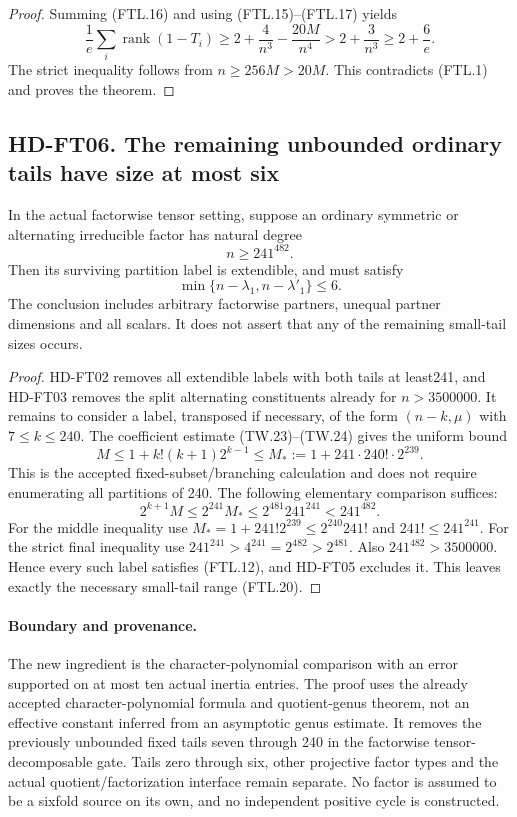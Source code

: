 \begin{proof}
Summing (FTL.16) and using (FTL.15)--(FTL.17) yields
\[
 \frac1e\sum_i\operatorname{rank}(1-T_i)
 \ge2+\frac4{n^3}-\frac{20M}{n^4}
 >2+\frac3{n^3}\ge2+\frac6e.
 \tag{FTL.18}
\]
The strict inequality follows from $n\ge256M>20M$.
This contradicts (FTL.1) and proves the theorem.
\end{proof}

\subsection*{HD-FT06. The remaining unbounded ordinary tails have size at most six}

\begin{corollary}[HD-FT06]
In the actual factorwise tensor setting, suppose an ordinary
symmetric or alternating irreducible factor has natural degree
\[
                              n\ge241^{482}.
 \tag{FTL.19}
\]
Then its surviving partition label is extendible, and must satisfy
\[
                  \min\{n-\lambda_1,n-\lambda'_1\}\le6.
 \tag{FTL.20}
\]
The conclusion includes arbitrary factorwise partners, unequal
partner dimensions and all scalars.  It does not assert that any
of the remaining small-tail sizes occurs.
\end{corollary}

\begin{proof}
HD-FT02 removes all extendible labels with both tails at least241,
and HD-FT03 removes the split alternating constituents already for
$n>3500000$.  It remains to consider a label, transposed if necessary,
of the form $(n-k,\mu)$ with $7\le k\le240$.
The coefficient estimate (TW.23)--(TW.24) gives the uniform bound
\[
 M\le1+k!(k+1)2^{k-1}
        \le M_*:=1+241\cdot240!\cdot2^{239}.
 \tag{FTL.21}
\]
This is the accepted fixed-subset/branching calculation and does not
require enumerating all partitions of 240.
The following elementary comparison suffices:
\[
 2^{k+1}M\le2^{241}M_*
       \le2^{481}241^{241}<241^{482}.
 \tag{FTL.22}
\]
For the middle inequality use $M_*=1+241!2^{239}\le2^{240}241!$
and $241!\le241^{241}$.  For the strict final inequality use
$241^{241}>4^{241}=2^{482}>2^{481}$.
Also $241^{482}>3500000$.  Hence every such label satisfies
(FTL.12), and HD-FT05 excludes it.  This leaves exactly the necessary
small-tail range (FTL.20).
\end{proof}

\paragraph{Boundary and provenance.}
The new ingredient is the character-polynomial comparison with an error
supported on at most ten actual inertia entries.  The proof uses the
already accepted character-polynomial formula and quotient-genus theorem,
not an effective constant inferred from an asymptotic genus estimate.
It removes the previously unbounded fixed tails seven through 240
in the factorwise tensor-decomposable gate.  Tails zero through six,
other projective factor types and the actual quotient/factorization
interface remain separate.  No factor is assumed to be a sixfold
source on its own, and no independent positive cycle is constructed.
